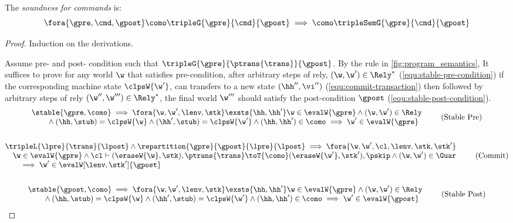 \begin{theorem}
\label{thm:command-soundness}
\label{thm:per-thread-soundness}
The \emph{soundness for commands} is:
\[
    \fora{\gpre, \cmd, \gpost}
    \como \tripleG{\gpre}{\cmd}{\gpost} 
    \implies 
    \como \tripleSemG{\gpre}{\cmd}{\gpost} 
\]
\end{theorem}
\begin{proof}
Induction on the derivations.


Assume pre- and post- condition such that \( \tripleG{\gpre}{\ptrans{\trans}}{\gpost}  \).
By the  rule in \cref{fig:program_semantics}, It suffices to prove for any world \( \w \) that satisfies pre-condition, after arbitrary steps of rely, \ie \( (\w, \w') \in \Rely^{*} \) (\cref{equ:stable-pre-condition}) if the corresponding machine state \(\clpsW{\w'}\), can transfers to a new state \((\hh'',\vi'')\) (\cref{equ:commit-transaction}) then followed by arbitrary steps of rely \((\w'',\w''') \in \Rely^{*} \), the final world \( \w''' \) should satisfy the post-condition \(\gpost\) (\cref{equ:stable-post-condition}).
\begin{gather}
    \begin{array}{@{}l}
    \stable{\gpre, \como}  
    \implies 
    \fora{\w, \w',\lenv, \stk}  
    \exsts{ \hh, \hh' } 
    \w \in \evalW{\gpre} 
    \land (\w, \w') \in \Rely \\
    \qquad {} \land (\hh, \stub) = \clpsW{\w}
    \land (\hh', \stub) = \clpsW{\w'}
    \land (\hh, \hh') \in \como
    \implies \w' \in \evalW{\gpre} 
    \end{array} \tag{Stable Pre} \label{equ:stable-pre-condition} \\
    \nonumber \\
%
    \begin{array}{@{}l}
    \tripleL{\lpre}{\trans}{\lpost}
    \land \repartition{\gpre}{\gpost}{\lpre}{\lpost}
    \implies 
    \fora{\w, \w', \cl, \lenv, \stk, \stk'} \\
    \quad \w \in \evalW{\gpre}
    \land \cl \vdash (\eraseW{\w}, \stk), \ptrans{\trans} 
    \toT{\como} (\eraseW{\w'}, \stk'), \pskip 
    \land (\w, \w') \in \Guar \\
    \qquad \implies \w' \in \evalW[\lenv, \stk']{\gpost} 
    \end{array} \tag{Commit} \label{equ:commit-transaction} \\
    \nonumber \\
%
    \begin{array}{@{}l}
    \stable{\gpost, \como}  
    \implies 
    \fora{\w, \w',\lenv, \stk}  
    \exsts{ \hh, \hh' } 
    \w \in \evalW{\gpre} 
    \land (\w, \w') \in \Rely \\
    \qquad {} \land (\hh, \stub) = \clpsW{\w}
    \land (\hh', \stub) = \clpsW{\w'}
    \land (\hh, \hh') \in \como
    \implies \w' \in \evalW{\gpost} 
    \end{array} \tag{Stable Post} \label{equ:stable-post-condition} 
\end{gather}



\end{proof}
